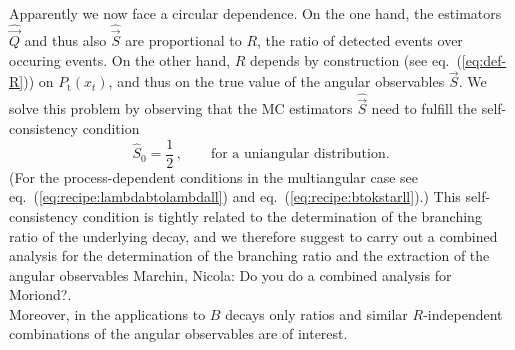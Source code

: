 \documentclass[aps,nofootinbib,preprintnumbers,prd,twocolumn]{revtex4-1}
\newcommand{\est}[1]{\widehat{#1}}
\newcommand{\refeq}[1]{eq.~(\ref{eq:#1})}
\newcommand{\vecest}[1]{\widehat{\vec{#1}}}
\newcommand{\fred}[1]{{\color{brown!85!black}#1}}
\newcommand{\add}[1]{\textcolor{green!85!black}{#1}}
\begin{document}
\add{Apparently we now face a circular dependence. On the one hand,
the estimators $\vecest{Q}$ and thus also $\vecest{S}$
are proportional to $R$, the ratio of detected events over occuring events.
On the other hand, $R$ depends by construction (see \refeq{def-R})
on $P_\text{t}(x_t)$, and thus on the true value of the angular observables $\vec{S}$.
We solve this problem by observing that the MC estimators $\vecest{S}$ need to fulfill
the self-consistency condition
\begin{equation}
    \est{S}_0 = \frac{1}{2}\,,\qquad\text{for a uniangular distribution}.
\end{equation}
(For the process-dependent conditions in the multiangular case see \refeq{recipe:lambdabtolambdall} and
\refeq{recipe:btokstarll}.)
This self-consistency condition is tightly related to the determination of
the branching ratio of the underlying decay, and we therefore suggest to
carry out a combined analysis for the determination of the branching ratio
and the extraction of the angular observables \fred{Marchin, Nicola: Do you do a combined analysis for Moriond?}.\\
Moreover, in the applications to $B$ decays only ratios and similar $R$-independent combinations
of the angular observables are of interest.
}\\
\end{document}
